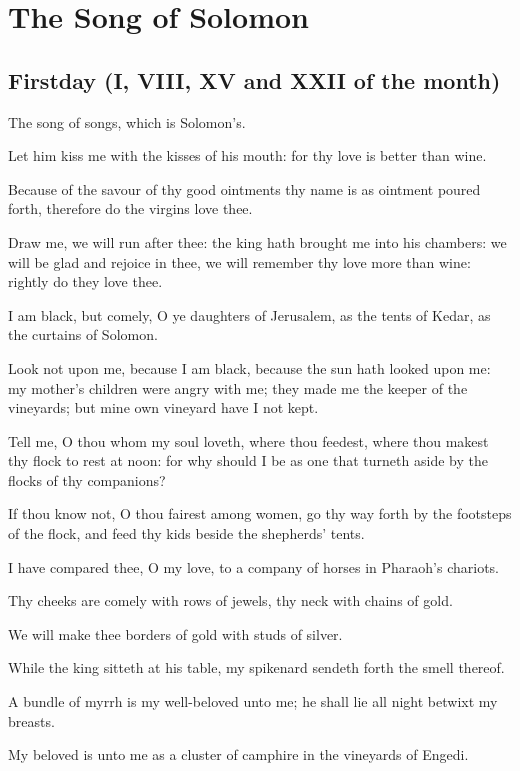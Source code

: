 \chapter{The Song of Solomon}

\explainverseamended

\section{Firstday (I, VIII, XV and XXII of the month)}

The song of songs, which is Solomon's.

Let him kiss me with the kisses of his mouth: for thy love is better than wine.

Because of the savour of thy good ointments thy name is as ointment poured forth, therefore do the virgins love thee.

\verseamended Draw me, we will run after thee: the king hath brought me into his chambers: we will be glad and rejoice in thee, we will remember thy love more than wine: rightly do they love thee.

I am black, but comely, O ye daughters of Jerusalem, as the tents of Kedar, as the curtains of Solomon.

Look not upon me, because I am black, because the sun hath looked upon me: my mother's children were angry with me; they made me the keeper of the vineyards; but mine own vineyard have I not kept.

Tell me, O thou whom my soul loveth, where thou feedest, where thou makest thy flock to rest at noon: for why should I be as one that turneth aside by the flocks of thy companions?

If thou know not, O thou fairest among women, go thy way forth by the footsteps of the flock, and feed thy kids beside the shepherds' tents.

I have compared thee, O my love, to a company of horses in Pharaoh's chariots.

Thy cheeks are comely with rows of jewels, thy neck with chains of gold.

We will make thee borders of gold with studs of silver.

While the king sitteth at his table, my spikenard sendeth forth the smell thereof.

A bundle of myrrh is my well-beloved unto me; he shall lie all night betwixt my breasts.

My beloved is unto me as a cluster of camphire in the vineyards of Engedi.

